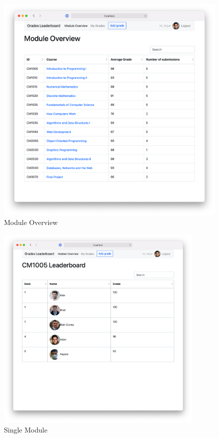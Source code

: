 \begin{figure}[H]
    \centering
    \includegraphics[width=15cm]{images/moduleoverview.png}
    \caption{Module Overview}
    \label{fig:moduleoverview}
\end{figure}

\begin{figure}[H]
    \centering
    \includegraphics[width=10cm]{images/module.png}
    \caption{Single Module}
    \label{fig:module}
\end{figure}

